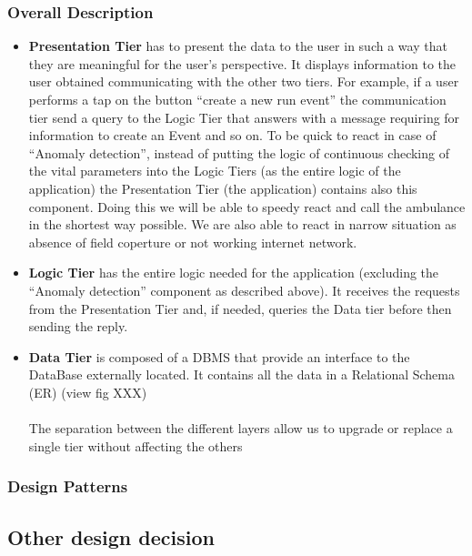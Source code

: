 \documentclass[DD.tex]{subfiles}
\begin{document}
\subsubsection{Overall Description}
\begin{itemize}
	\item \textbf{Presentation Tier} has to present the data to the user in such a way that they are meaningful for the user’s perspective. It displays information to the user obtained communicating with the other two tiers. For example, if a user performs a tap on the button “create a new run event” the communication tier send a query to the Logic Tier that answers with a message requiring for information to create an Event and so on.
		To be quick to react in case of “Anomaly detection”, instead of putting the logic of continuous checking of the vital parameters into the Logic Tiers (as the entire logic of the application) the Presentation Tier (the application) contains also this component. Doing this we will be able to speedy react and call the ambulance in the shortest way possible. We are also able to react in narrow situation as absence of field coperture or not working internet network.
	\item \textbf{Logic Tier} has the entire logic needed for the application (excluding the “Anomaly detection” component as described above). It receives the requests from the Presentation Tier and, if needed, queries the Data tier before then sending the reply.
	\item \textbf{Data Tier} is composed of a DBMS that provide an interface to the DataBase externally located. It contains all the data in a Relational Schema (ER) (view fig XXX)\\\\
	The separation between the different layers allow us to upgrade or replace a single tier without affecting the others
\end{itemize}
\subsubsection{Design Patterns}


\newpage

\subsection{Other design decision}
\end{document}
